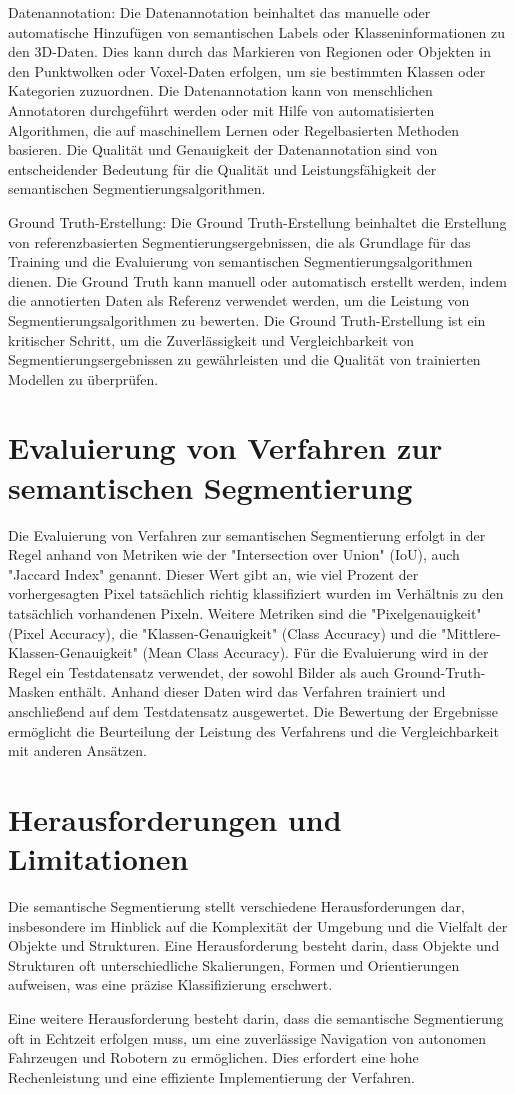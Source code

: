 Datenannotation: Die Datenannotation beinhaltet das manuelle oder automatische
Hinzufügen von semantischen Labels oder Klasseninformationen zu den 3D-Daten.
Dies kann durch das Markieren von Regionen oder Objekten in den Punktwolken
oder Voxel-Daten erfolgen, um sie bestimmten Klassen oder Kategorien
zuzuordnen. Die Datenannotation kann von menschlichen Annotatoren durchgeführt
werden oder mit Hilfe von automatisierten Algorithmen, die auf maschinellem
Lernen oder Regelbasierten Methoden basieren. Die Qualität und Genauigkeit der
Datenannotation sind von entscheidender Bedeutung für die Qualität und
Leistungsfähigkeit der semantischen Segmentierungsalgorithmen.

Ground Truth-Erstellung: Die Ground Truth-Erstellung beinhaltet die Erstellung
von referenzbasierten Segmentierungsergebnissen, die als Grundlage für das
Training und die Evaluierung von semantischen Segmentierungsalgorithmen dienen.
Die Ground Truth kann manuell oder automatisch erstellt werden, indem die
annotierten Daten als Referenz verwendet werden, um die Leistung von
Segmentierungsalgorithmen zu bewerten. Die Ground Truth-Erstellung ist ein
kritischer Schritt, um die Zuverlässigkeit und Vergleichbarkeit von
Segmentierungsergebnissen zu gewährleisten und die Qualität von trainierten
Modellen zu überprüfen.

\section{Evaluierung von Verfahren zur semantischen Segmentierung}
Die Evaluierung von Verfahren zur semantischen Segmentierung erfolgt in der
Regel anhand von Metriken wie der "Intersection over Union" (IoU), auch
"Jaccard Index" genannt. Dieser Wert gibt an, wie viel Prozent der
vorhergesagten Pixel tatsächlich richtig klassifiziert wurden im Verhältnis zu
den tatsächlich vorhandenen Pixeln. Weitere Metriken sind die
"Pixelgenauigkeit" (Pixel Accuracy), die "Klassen-Genauigkeit" (Class Accuracy)
und die "Mittlere-Klassen-Genauigkeit" (Mean Class Accuracy). Für die
Evaluierung wird in der Regel ein Testdatensatz verwendet, der sowohl Bilder
als auch Ground-Truth-Masken enthält. Anhand dieser Daten wird das Verfahren
trainiert und anschließend auf dem Testdatensatz ausgewertet. Die Bewertung der
Ergebnisse ermöglicht die Beurteilung der Leistung des Verfahrens und die
Vergleichbarkeit mit anderen Ansätzen.
\section{Herausforderungen und Limitationen}
Die semantische Segmentierung stellt verschiedene Herausforderungen dar,
insbesondere im Hinblick auf die Komplexität der Umgebung und die Vielfalt der
Objekte und Strukturen. Eine Herausforderung besteht darin, dass Objekte und
Strukturen oft unterschiedliche Skalierungen, Formen und Orientierungen
aufweisen, was eine präzise Klassifizierung erschwert.

Eine weitere Herausforderung besteht darin, dass die semantische Segmentierung
oft in Echtzeit erfolgen muss, um eine zuverlässige Navigation von autonomen
Fahrzeugen und Robotern zu ermöglichen. Dies erfordert eine hohe Rechenleistung
und eine effiziente Implementierung der Verfahren.
